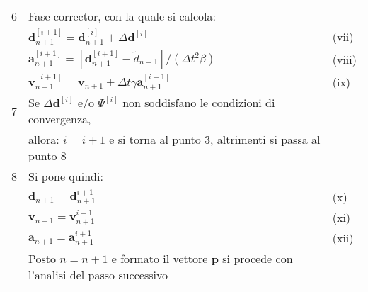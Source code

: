 \begin{table}
\begin{tabular}{lll}
	6 & Fase corrector, con la quale si calcola:                                                                                                                                  &        \\
	  & $\boldsymbol{d}_{n+1}^{[i+1]} = \boldsymbol{d}_{n+1}^{[i]} + \varDelta \boldsymbol{d}^{[i]}$                                                                              & (vii)  \\
	  & $\boldsymbol{a}_{n+1}^{[i+1]} = [\boldsymbol{d}_{n+1}^{[i+1]} - \tilde{d}_{n+1}] /(\varDelta t^2 \beta)$                                                                  & (viii) \\
	  & $\boldsymbol{v}_{n+1}^{[i+1]} = \boldsymbol{v}_{n+1} + \varDelta t \gamma \boldsymbol{a}_{n+1}^{[i+1]}$                                                                   & (ix)   \\
	7 & Se $\varDelta \boldsymbol{d}^{[i]}$ e/o $\boldsymbol{\varPsi}^{[i]} $ non soddisfano le condizioni di convergenza,                                                        &        \\   
	  & allora: $i= i+1$ e si torna al punto 3, altrimenti si passa al punto 8                                                                                                    &        \\ 
	8 & Si pone quindi:                                                                                                                                                           &        \\
	  & $\boldsymbol{d}_{n+1} = \boldsymbol{d}_{n+1}^{i+1}$                                                                                                                       & (x)    \\  
	  & $\boldsymbol{v}_{n+1} = \boldsymbol{v}_{n+1}^{i+1}$                                                                                                                       & (xi)   \\  
	  & $\boldsymbol{a}_{n+1} = \boldsymbol{a}_{n+1}^{i+1}$                                                                                                                       & (xii)  \\  
	  & Posto $n=n+1$ e formato il vettore $\boldsymbol{p}$ si procede con l'analisi del passo successivo                                                                         &        \\
	\bottomrule    
\end{tabular}
\end{table}


